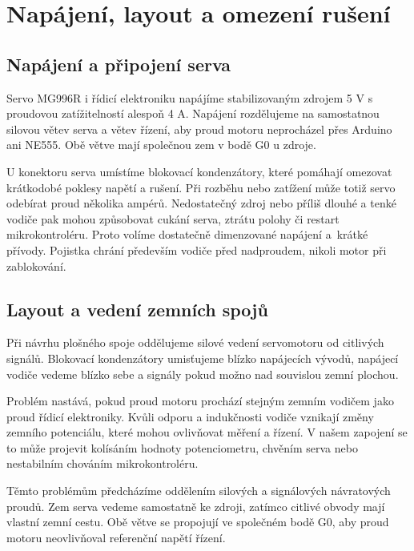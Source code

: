 
\chapter{Napájení, layout a omezení rušení}
\label{chap:layout}

\section{Napájení a připojení serva}

Servo MG996R i řídicí elektroniku napájíme stabilizovaným zdrojem 5 V s proudovou zatížitelností alespoň 4 A. Napájení rozdělujeme na samostatnou silovou větev serva a větev řízení, aby proud motoru neprocházel přes Arduino ani NE555. Obě větve mají společnou zem v bodě G0 u zdroje.

U konektoru serva umístíme blokovací kondenzátory, které pomáhají omezovat krátkodobé poklesy napětí a rušení. Při rozběhu nebo zatížení může totiž servo odebírat proud několika ampérů. Nedostatečný zdroj nebo příliš dlouhé a tenké vodiče pak mohou způsobovat cukání serva, ztrátu polohy či restart mikrokontroléru. Proto volíme dostatečně dimenzované napájení a~krátké přívody. Pojistka chrání především vodiče před nadproudem, nikoli motor při zablokování.

\section{Layout a vedení zemních spojů}

Při návrhu plošného spoje oddělujeme silové vedení servomotoru od citlivých signálů. Blokovací kondenzátory umisťujeme blízko napájecích vývodů, napájecí vodiče vedeme blízko sebe a signály pokud možno nad souvislou zemní plochou.~\cite{tiemi,mt031}

Problém nastává, pokud proud motoru prochází stejným zemním vodičem jako proud řídicí elektroniky. Kvůli odporu a indukčnosti vodiče vznikají změny zemního potenciálu, které mohou ovlivňovat měření a řízení. V našem zapojení se to může projevit kolísáním hodnoty potenciometru, chvěním serva nebo nestabilním chováním mikrokontroléru.

\noindent\begin{minipage}{\textwidth}\centering
\resizebox{.90\textwidth}{!}{}
\captionsetup{hypcap=false}
\label{fig:zeme}
\end{minipage}\medskip

Těmto problémům předcházíme oddělením silových a signálových návratových proudů. Zem serva vedeme samostatně ke zdroji, zatímco citlivé obvody mají vlastní zemní cestu. Obě větve se propojují ve společném bodě G0, aby proud motoru neovlivňoval referenční napětí řízení.

